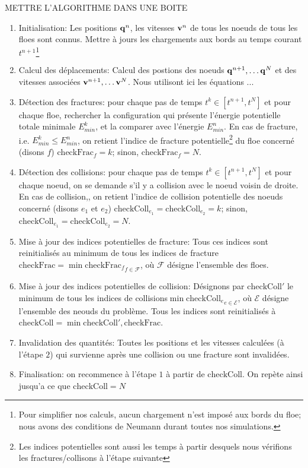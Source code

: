 METTRE L'ALGORITHME DANS UNE BOITE
\begin{enumerate}
    \item Initialisation: Les positions $\bm{\mathrm{q}}^{n}$, les vitesses $\bm{\mathrm{v}}^n$ de tous les noeuds de tous les floes sont connus. Mettre à jours les chargements aux bords au temps courant $t^{n+1}$\footnote{Pour simplifier nos calculs, aucun chargement n'est imposé aux bords du floe; nous avons des conditions de Neumann durant toutes nos simulations.}
    \item Calcul des déplacements: Calcul des postions des noeuds $\bm{\mathrm{q}}^{n+1}, \ldots \bm{\mathrm{q}}^{N}$ et des vitesses associées $\bm{\mathrm{v}}^{n+1}, \ldots \bm{\mathrm{v}}^{N}$. Nous utilisont ici les équations ... 
    \item Détection des fractures: pour chaque pas de temps $t^k \in [t^{n+1}, t^{N}]$ et pour chaque floe, rechercher la configuration qui présente l'énergie potentielle totale minimale $E^{k}_{min}$, et la comparer avec l'énergie $E^n_{min}$. En cas de fracture, i.e. $E^{k}_{min} \leq E^n_{min}$, on retient l'indice de fracture potentielle\footnote{Les indices potentielles sont aussi les temps à partir desquels nous vérifions les fractures/collisons à l'étape suivante} du floe concerné (disons $f$) $\text{checkFrac}_f = k$; sinon, $\text{checkFrac}_f = N$.
    \item Détection des collisions: pour chaque pas de temps $t^k \in [t^{n+1}, t^{N}]$ et pour chaque noeud, on se demande s'il y a collision avec le noeud voisin de droite. En cas de collision,, on retient l'indice de collision potentielle des noeuds concerné (disons $e_1$ et $e_2$) $\text{checkColl}_{e_1} = \text{checkColl}_{e_2} =k$; sinon, $\text{checkColl}_{e_1} = \text{checkColl}_{e_2} = N$.
    \item Mise à jour des indices potentielles de fracture: Tous ces indices sont reinitialisés au minimum de tous les indices de fracture $\text{checkFrac} = \min{\text{checkFrac}_f}_{f \in \mathcal{F}}$, où $\mathcal{F}$ désigne l'ensemble des floes.
    \item Mise à jour des indices potentielles de collision: Désignons par $\text{checkColl}'$ le minimum de tous les indices de collisions$\min{\text{checkColl}_e}_{e \in \mathcal{E}}$, où $\mathcal{E}$ désigne l'ensemble des neouds du problème. Tous les indices sont reinitialisés à $\text{checkColl} = \min{\text{checkColl}', \text{checkFrac}}$.
    \item Invalidation des quantités: Toutes les positions et les vitesses calculées (à l'étape $2$) qui survienne après une collision ou une fracture sont invalidées.
    \item Finalisation: on recommence à l'étape $1$ à partir de $\text{checkColl}$. On repète ainsi jusqu'a ce que $\text{checkColl} = N$
\end{enumerate}


